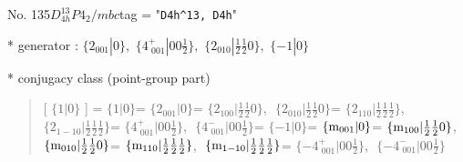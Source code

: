 \documentclass[fleqn,10pt,landscape]{jsarticle}
\begin{document}
\newpage

No. 135\quad$D_{4h}^{13}$\quad$P4_2/mbc$\quad[ tetragonal ]
tag = "{\tt D4h^13, D4h}"

* generator : $\{2{}_{001}|0\},\,\,\{4^{+}_{\,\,001}|0 0 \frac{1}{2}\},\,\,\{2{}_{010}|\frac{1}{2} \frac{1}{2} 0\},\,\,\{-1|0\}$

* conjugacy class (point-group part)
\begin{quote}
[ $\{1|0\}$ ] = \quad $\{1|0\}$\newline[ $\{2{}_{001}|0\}$ ] = \quad $\{2{}_{001}|0\}$ = \quad $\{2{}_{100}|\frac{1}{2} \frac{1}{2} 0\}$,\,\, $\{2{}_{010}|\frac{1}{2} \frac{1}{2} 0\}$ = \quad $\{2{}_{110}|\frac{1}{2} \frac{1}{2} \frac{1}{2}\}$,\,\, $\{2{}_{1-10}|\frac{1}{2} \frac{1}{2} \frac{1}{2}\}$\newline[ $\{4^{+}_{\,\,001}|0 0 \frac{1}{2}\}$ ] = \quad $\{4^{+}_{\,\,001}|0 0 \frac{1}{2}\}$,\,\, $\{4^{-}_{\,\,001}|0 0 \frac{1}{2}\}$\newline[ $\{-1|0\}$ ] = \quad $\{-1|0\}$\newline[ $\{{\rm m}_{001}|0\}$ ] = \quad $\{{\rm m}_{001}|0\}$ = \quad $\{{\rm m}_{100}|\frac{1}{2} \frac{1}{2} 0\}$,\,\, $\{{\rm m}_{010}|\frac{1}{2} \frac{1}{2} 0\}$ = \quad $\{{\rm m}_{110}|\frac{1}{2} \frac{1}{2} \frac{1}{2}\}$,\,\, $\{{\rm m}_{1-10}|\frac{1}{2} \frac{1}{2} \frac{1}{2}\}$\newline[ $\{-4^{+}_{\,\,001}|0 0 \frac{1}{2}\}$ ] = \quad $\{-4^{+}_{\,\,001}|0 0 \frac{1}{2}\}$,\,\, $\{-4^{-}_{\,\,001}|0 0 \frac{1}{2}\}$\newline
\end{quote}
\end{document}
